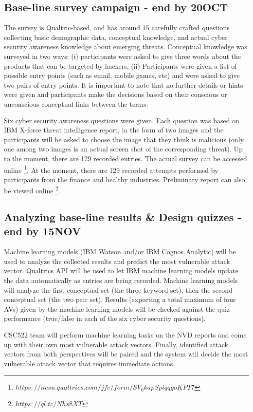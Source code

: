 \documentclass[conference]{IEEEtran}
\begin{document}
\subsection{Base-line survey campaign - end by 20OCT}
The survey is Qualtric-based, and has around 15 carefully crafted questions collecting basic demographic data, conceptual knowledge, and actual cyber security awareness knowledge about emerging threats. Conceptual knowledge was surveyed in two ways: (i) participants were asked to give three words about the products that can be targeted by hackers, (ii) Participants were given a list of possible entry points (such as email, mobile games, etc) and were asked to give two pairs of entry points. It is important to note that no further details or hints were given and participants make the decisions based on their conscious or unconscious conceptual links between the terms.

Six cyber security awareness questions were given. Each question was based on IBM X-force threat intelligence report, in the form of two images and the participants will be asked to choose the image that they think is malicious (only one among two images is an actual screen shot of the corresponding threat). Up to the moment, there are 129 recorded entries. The actual survey can be accessed online \footnote{$https://ncsu.qualtrics.com/jfe/form/SV_0kapSpiqqgoKPT7$}. At the moment, there are 129 recorded attempts performed by participants from the finance and healthy industries. Preliminary report can also be viewed online \footnote{$https://ql.tc/Nhs8XT$}.

\subsection{Analyzing base-line results \& Design quizzes - end by 15NOV}
Machine learning models (IBM Watson and/or IBM Cognos Analytic) will be used to analyze the collected results and predict the most vulnerable attack vector. Qualtrics API will be used to let IBM machine learning models update the data automatically as entries are being recorded. Machine learning models will analyze the first conceptual set (the three keyword set), then the second conceptual set (the two pair set). Results (expecting a total maximum of four AVs) given by the machine learning models will be checked against the quiz performance (true/false in each of the six cyber security questions).

CSC522 team will perform machine learning tasks on the NVD reports and come up with their own most vulnerable attack vectors. Finally, identified attack vectors from both perspectives will be paired and the system will decide the most vulnerable attack vector that requires immediate actions.
\end{document}
